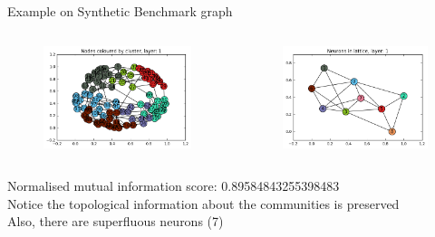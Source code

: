 \documentclass{beamer}
\begin{document}
	\begin{frame}{Example on Synthetic Benchmark graph}
	\begin{columns}
		\begin{figure}
		\centering
		\includegraphics[scale=0.4]{benchmark.png}
		\end{figure}
		\begin{figure}
		\centering
		\includegraphics[scale=0.4]{map.png}
		\end{figure}
	\end{columns}
		Normalised mutual information score: 0.89584843255398483\\
		Notice the topological information about the communities is preserved \\
		Also, there are superfluous neurons (7)
	\end{frame}
\end{document}
